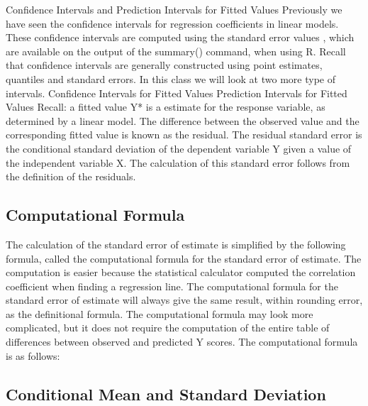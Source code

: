 Confidence Intervals and Prediction Intervals for Fitted Values
Previously we have seen the confidence intervals for regression coefficients in linear models. These confidence intervals are computed using the standard error values , which are available on the output of the summary() command, when using R.
Recall that confidence intervals are generally constructed using point estimates, quantiles and standard errors.
In this class we will look at two more type of intervals.
Confidence Intervals for Fitted Values Prediction Intervals for Fitted Values
Recall: a fitted value Y* is a estimate for the response variable, as determined by a linear model. The difference between the observed value and the corresponding fitted value is known as the residual.
The residual standard error is the conditional standard deviation of the dependent variable Y given a value of the independent variable X. The calculation of this standard error follows from the 
definition of the residuals.




\subsection*{Computational Formula}


The calculation of the standard error of estimate is simplified by the following formula, called the computational formula for the standard error of estimate. 
The computation is easier because the statistical calculator computed the correlation coefficient when finding a regression line. 
The computational formula for the standard error of estimate will always give the same result, within rounding error, as the definitional formula. 
The computational formula may look more complicated, but it does not require the computation of the entire table of differences between observed and predicted Y scores. The computational formula is as follows:





\subsection{Conditional Mean and Standard Deviation}


